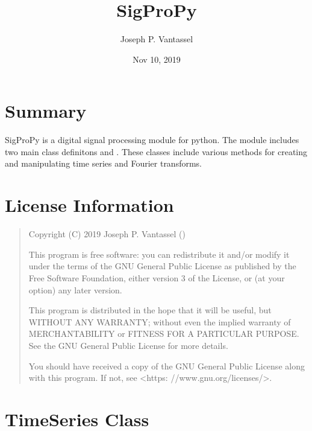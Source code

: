 \documentclass[letterpaper,10pt,english]{sphinxmanual}
\title{SigProPy}
\date{Nov 10, 2019}
\author{Joseph P.\@{} Vantassel}
\begin{document}
\pagestyle{empty}
\sphinxmaketitle
\pagestyle{plain}
\sphinxtableofcontents
\pagestyle{normal}
\label{\detokenize{index::doc}}



\chapter{Summary}
\label{\detokenize{index:summary}}
SigProPy is a digital signal processing module for python. The module includes
two main class definitons  and . These classes
include various methods for creating and manipulating time series and Fourier
transforms.


\chapter{License Information}
\label{\detokenize{index:license-information}}\begin{quote}

Copyright (C) 2019 Joseph P. Vantassel ()

This program is free software: you can redistribute it and/or modify
it under the terms of the GNU General Public License as published by
the Free Software Foundation, either version 3 of the License, or
(at your option) any later version.

This program is distributed in the hope that it will be useful,
but WITHOUT ANY WARRANTY; without even the implied warranty of
MERCHANTABILITY or FITNESS FOR A PARTICULAR PURPOSE.  See the
GNU General Public License for more details.

You should have received a copy of the GNU General Public License
along with this program.  If not, see \textless{}https: //www.gnu.org/licenses/\textgreater{}.
\end{quote}


\chapter{TimeSeries Class}
\label{\detokenize{index:timeseries-class}}
\end{document}
